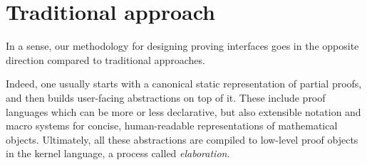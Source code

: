 \section{Traditional approach}

In a sense, our methodology for designing proving interfaces goes in the
opposite direction compared to traditional approaches.

Indeed, one usually starts with a canonical static representation of partial
proofs, and then builds user-facing abstractions on top of
it. These include proof languages which can be more or less
declarative, but also extensible
notation and macro systems \cite{ullrich_beyond_2022} for concise,
human-readable representations of mathematical objects. Ultimately, all these
abstractions are compiled to low-level proof objects in the kernel language, a
process called \emph{elaboration}.

